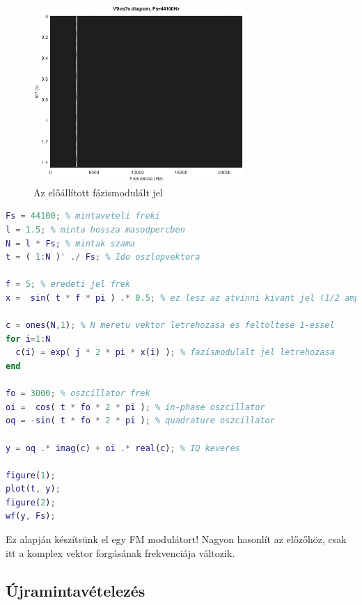 \documentclass[12pt,a4paper]{article}
\begin{document}
\begin{figure}[H]
\begin{center}
\includegraphics[width=8cm]{figures/modulaciok_workshop_phase.eps}
\caption{Az előállított fázismodulált jel}
\label{fig:phase}
\end{center}
\end{figure}
\clearpage
\begin{lstlisting}[frame=single,language=matlab,caption=Fázismoduláció IQ modulátorral]
Fs = 44100; % mintaveteli freki
l = 1.5; % minta hossza masodpercben
N = l * Fs; % mintak szama
t = ( 1:N )' ./ Fs; % Ido oszlopvektora

f = 5; % eredeti jel frek
x =  sin( t * f * pi ) .* 0.5; % ez lesz az atvinni kivant jel (1/2 amplitudo)

c = ones(N,1); % N meretu vektor letrehozasa es feltoltese 1-essel
for i=1:N
  c(i) = exp( j * 2 * pi * x(i) ); % fazismodulalt jel letrehozasa
end

fo = 3000; % oszcillator frek
oi =  cos( t * fo * 2 * pi ); % in-phase oszcillator
oq = -sin( t * fo * 2 * pi ); % quadrature oszcillator

y = oq .* imag(c) + oi .* real(c); % IQ keveres

figure(1);
plot(t, y);
figure(2);
wf(y, Fs);
\end{lstlisting}

Ez alapján készítsünk el egy FM modulátort! Nagyon hasonlít az előzőhöz, csak itt a komplex vektor forgásának frekvenciája változik.

\subsection{Újramintavételezés}
\end{document}
